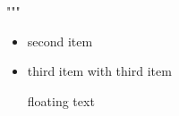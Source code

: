 """\begin{itemize}
    \item second item
    \item


    third item
    with third item

    floating text
    \end{itemize}
